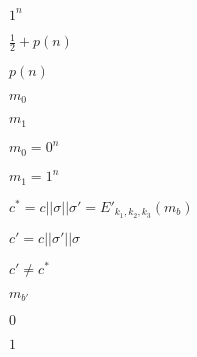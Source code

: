 \documentclass[10pt]{book}
\begin{document}
\begin{mdSnippets}
\begin{mdInlineSnippet}
$1^n$\end{mdInlineSnippet}%
\begin{mdInlineSnippet}[64f5991003da134cc68fa343d048ebac]%
$\frac{1}{2} + p(n)$\end{mdInlineSnippet}%
\begin{mdInlineSnippet}%
$p(n)$\end{mdInlineSnippet}%
\begin{mdInlineSnippet}[fed1e4775925bd3f7af0c5d8fc47e4e6]%
$m_0$\end{mdInlineSnippet}%
\begin{mdInlineSnippet}%
$m_1$\end{mdInlineSnippet}%
\begin{mdInlineSnippet}[185b3f7b453a8153334176c86e181bda]%
$m_0 = 0^n$\end{mdInlineSnippet}%
\begin{mdInlineSnippet}[167f7197211e2ff40ae15b434b04fe9e]%
$m_1 = 1^n$\end{mdInlineSnippet}%
\begin{mdInlineSnippet}[bd846671d7779796bbc7a1988af4256e]%
$c^* = c || \sigma || \sigma' = E'_{k_1,k_2,k_3}(m_b)$\end{mdInlineSnippet}%
\begin{mdInlineSnippet}%
$c' = c || \sigma' || \sigma$\end{mdInlineSnippet}%
\begin{mdInlineSnippet}[524330cee1943c719d608d0905e402f6]%
$c' \neq c^*$\end{mdInlineSnippet}%
\begin{mdInlineSnippet}[8a5f9350a399fb01c63d06ace762e1d5]%
$m_{b'}$\end{mdInlineSnippet}%
\begin{mdInlineSnippet}%
$0$\end{mdInlineSnippet}%
\begin{mdInlineSnippet}[c4ca4238a0b923820dcc509a6f75849b]%
$1$\end{mdInlineSnippet}%
\begin{mdInlineSnippet}[7960e7402c420dc1ba0324867807f1f6]%

\end{mdInlineSnippet}
\end{mdSnippets}
\end{document}

